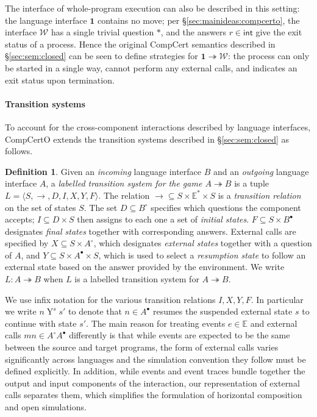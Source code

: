 \documentclass[draft,11pt]{report}
\theoremstyle{definition}
\newtheorem{definition}[theorem]{Definition}
\newcommand{\kw}[1]{\ensuremath{ \mathsf{#1} }}
\newcommand{\que}{\circ}         %
\newcommand{\ans}{\bullet}       %
\begin{document}
The interface of whole-program execution
can also be described in this setting:
the language interface $\mathbf{1}$ contains no move;
per \S\ref{sec:mainideas:compcerto},
the interface $\mathcal{W}$ has a single trivial question $*$,
and the answers $r \in \kw{int}$
give the exit status of a process.
Hence the original CompCert semantics described in
\S\ref{sec:sem:closed}
can be seen to define strategies for
$\mathbf{1} \twoheadrightarrow \mathcal{W}$:
the process can only be started in a single way,
cannot perform any external calls,
and indicates an exit status upon termination.


\paragraph{Transition systems} %

To account for the cross-component interactions
described by language interfaces,
CompCertO extends
the transition systems described in \S\ref{sec:sem:closed}
as follows.

\begin{definition} \label{def:lts}
Given an \emph{incoming} language interface $B$
and an \emph{outgoing} language interface $A$,
a \emph{labelled transition system for the game $A \twoheadrightarrow B$}
is a tuple $L = \langle S, \rightarrow, D, I, X, Y, F \rangle$.
The relation
${\rightarrow} \subseteq S \times \mathbb{E}^* \times S$ is
a \emph{transition relation} on the set of states $S$.
The set $D \subseteq B^\que$ specifies which
questions the component accepts;
$I \subseteq D \times S$ then
assigns to each one a set of \emph{initial states}.
$F \subseteq S \times B^\ans$
designates \emph{final states} together with corresponding answers.
External calls are specified by
$X \subseteq S \times A^\que$,
which designates \emph{external states} together with
a question of $A$, and
$Y \subseteq S \times A^\ans \times S$,
which is used to select a \emph{resumption state}
to follow an external state
based on the answer provided by the environment.
We write $L : A \twoheadrightarrow B$ when
$L$ is a labelled transition system for $A \twoheadrightarrow B$.
\end{definition}

We use infix notation for the various transition relations
$I, X, Y, F$.
In particular we write $n \mathrel{Y}^s s'$
to denote that $n \in A^\ans$
resumes the suspended external state $s$
to continue with state $s'$.
%
The main reason for treating
events $e \in \mathbb{E}$ and
external calls $m n \in A^\que A^\ans$
differently is that
while events are expected to be the same
between the source and target programs,
the form of external calls varies significantly
across languages
and the simulation convention they follow
must be defined explicitly.
In addition,
while events and event traces
bundle together the output and input
components of the interaction,
our representation of external calls
separates them,
which simplifies the formulation of
horizontal composition and open simulations.
\end{document}
